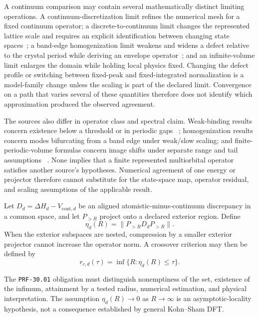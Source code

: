 A continuum comparison may contain several mathematically distinct limiting
operations. A continuum-discretization limit refines the numerical mesh for a
fixed continuum operator; a discrete-to-continuum limit changes the represented
lattice scale and requires an explicit identification between changing state
spaces~\cite{nakamuraTadano2021}; a band-edge homogenization limit weakens and
widens a defect relative to the crystal period while deriving an envelope
operator~\cite{hoeferWeinstein2011,ducheneVukicevicWeinstein2015}; and an
infinite-volume limit enlarges the domain while holding local physics fixed.
Changing the defect profile or switching between fixed-peak and
fixed-integrated normalization is a model-family change unless the scaling is
part of the declared limit. Convergence on a path that varies several of these
quantities therefore does not identify which approximation produced the
observed agreement.

The sources also differ in operator class and spectral claim. Weak-binding
results concern existence below a threshold or in periodic gaps
~\cite{simon1976weak,parzygnat2010}; homogenization results concern modes
bifurcating from a band edge under weak/slow scaling; and finite-periodic-volume
formulas concern image shifts under separate range and tail assumptions
~\cite{koenigLeeHammer2011}. None implies that a finite represented
multiorbital operator satisfies another source's hypotheses. Numerical
agreement of one energy or projector therefore cannot substitute for the
state-space map, operator residual, and scaling assumptions of the applicable
result.

Let $D_d=\Delta H_d-V_{\mathrm{cont},d}$ be an aligned atomistic-minus-continuum
discrepancy in a common space, and let $P_{>R}$ project onto a declared exterior
region. Define
\begin{equation}
  \eta_d(R)
  =
  \|P_{>R}D_dP_{>R}\|.
\end{equation}
When the exterior subspaces are nested, compression by a smaller exterior
projector cannot increase the operator norm. A crossover criterion may then be
defined by
\begin{equation}
  r_{c,d}(\tau)
  =
  \inf\{R:\eta_d(R)\leq\tau\}.
\end{equation}

The \texttt{PRF-30.01} obligation must distinguish nonemptiness of the set,
existence of the infimum, attainment by a tested radius, numerical estimation,
and physical interpretation. The assumption
$\eta_d(R)\to0$ as $R\to\infty$ is an asymptotic-locality hypothesis, not a
consequence established by general Kohn--Sham DFT.

